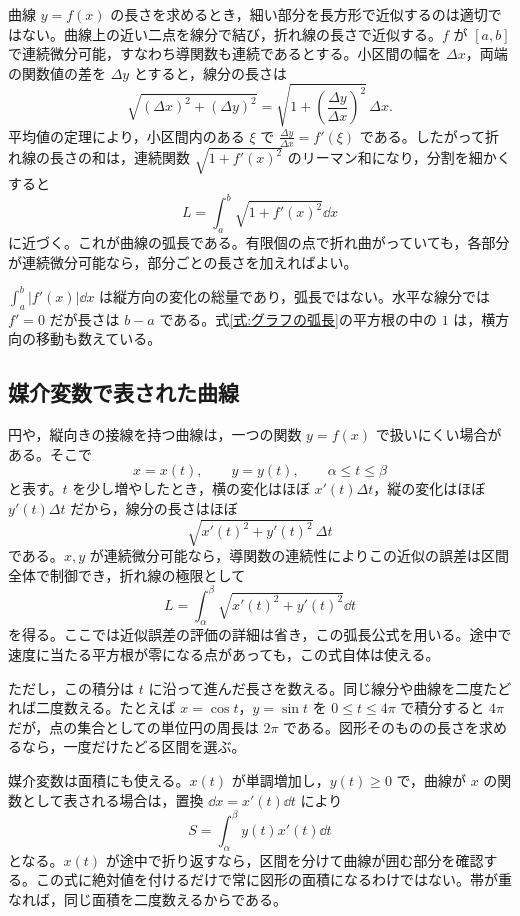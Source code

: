 曲線 $y=f(x)$ の長さを求めるとき，細い部分を長方形で近似するのは適切ではない。曲線上の近い二点を線分で結び，折れ線の長さで近似する。$f$ が $[a,b]$ で連続微分可能，すなわち導関数も連続であるとする。小区間の幅を $\Delta x$，両端の関数値の差を $\Delta y$ とすると，線分の長さは
\[
\sqrt{(\Delta x)^2+(\Delta y)^2}
 =\sqrt{1+\left(\frac{\Delta y}{\Delta x}\right)^2}\,\Delta x.
\]
平均値の定理により，小区間内のある $\xi$ で $\frac{\Delta y}{\Delta x}=f'(\xi)$ である。したがって折れ線の長さの和は，連続関数 $\sqrt{1+f'(x)^2}$ のリーマン和になり，分割を細かくすると
\begin{equation}\label{式:グラフの弧長}
L=\int_a^b\sqrt{1+f'(x)^2}\dd x
\end{equation}
に近づく。これが曲線の弧長である。有限個の点で折れ曲がっていても，各部分が連続微分可能なら，部分ごとの長さを加えればよい。

$\int_a^b|f'(x)|\dd x$ は縦方向の変化の総量であり，弧長ではない。水平な線分では $f'=0$ だが長さは $b-a$ である。式\eqref{式:グラフの弧長}の平方根の中の $1$ は，横方向の移動も数えている。

\subsection{媒介変数で表された曲線}

円や，縦向きの接線を持つ曲線は，一つの関数 $y=f(x)$ で扱いにくい場合がある。そこで
\[
x=x(t),\qquad y=y(t),\qquad \alpha\leq t\leq\beta
\]
と表す。$t$ を少し増やしたとき，横の変化はほぼ $x'(t)\Delta t$，縦の変化はほぼ $y'(t)\Delta t$ だから，線分の長さはほぼ
\[
\sqrt{x'(t)^2+y'(t)^2}\,\Delta t
\]
である。$x,y$ が連続微分可能なら，導関数の連続性によりこの近似の誤差は区間全体で制御でき，折れ線の極限として
\begin{equation}\label{式:媒介曲線の弧長}
L=\int_\alpha^\beta\sqrt{x'(t)^2+y'(t)^2}\dd t
\end{equation}
を得る。ここでは近似誤差の評価の詳細は省き，この弧長公式を用いる。途中で速度に当たる平方根が零になる点があっても，この式自体は使える。

ただし，この積分は $t$ に沿って進んだ長さを数える。同じ線分や曲線を二度たどれば二度数える。たとえば $x=\cos t$，$y=\sin t$ を $0\leq t\leq4\pi$ で積分すると $4\pi$ だが，点の集合としての単位円の周長は $2\pi$ である。図形そのものの長さを求めるなら，一度だけたどる区間を選ぶ。

媒介変数は面積にも使える。$x(t)$ が単調増加し，$y(t)\geq0$ で，曲線が $x$ の関数として表される場合は，置換 $\dd x=x'(t)\dd t$ により
\begin{equation}\label{式:媒介曲線の面積}
S=\int_\alpha^\beta y(t)x'(t)\dd t
\end{equation}
となる。$x(t)$ が途中で折り返すなら，区間を分けて曲線が囲む部分を確認する。この式に絶対値を付けるだけで常に図形の面積になるわけではない。帯が重なれば，同じ面積を二度数えるからである。

